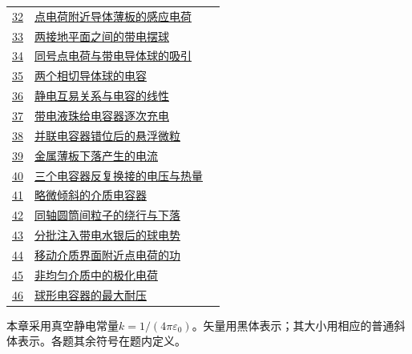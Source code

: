\documentclass[UTF8,fontset=fandol,a4paper,11pt]{ctexart}
\begin{document}
\begin{longtable}{@{}r p{113mm} r@{}}
\hyperref[q:32]{32} & \hyperref[q:32]{点电荷附近导体薄板的感应电荷} & \pageref{q:32} \\

\hyperref[q:33]{33} & \hyperref[q:33]{两接地平面之间的带电摆球} & \pageref{q:33} \\

\hyperref[q:34]{34} & \hyperref[q:34]{同号点电荷与带电导体球的吸引} & \pageref{q:34} \\

\hyperref[q:35]{35} & \hyperref[q:35]{两个相切导体球的电容} & \pageref{q:35} \\

\hyperref[q:36]{36} & \hyperref[q:36]{静电互易关系与电容的线性} & \pageref{q:36} \\

\hyperref[q:37]{37} & \hyperref[q:37]{带电液珠给电容器逐次充电} & \pageref{q:37} \\

\hyperref[q:38]{38} & \hyperref[q:38]{并联电容器错位后的悬浮微粒} & \pageref{q:38} \\

\hyperref[q:39]{39} & \hyperref[q:39]{金属薄板下落产生的电流} & \pageref{q:39} \\

\hyperref[q:40]{40} & \hyperref[q:40]{三个电容器反复换接的电压与热量} & \pageref{q:40} \\

\hyperref[q:41]{41} & \hyperref[q:41]{略微倾斜的介质电容器} & \pageref{q:41} \\

\hyperref[q:42]{42} & \hyperref[q:42]{同轴圆筒间粒子的绕行与下落} & \pageref{q:42} \\

\hyperref[q:43]{43} & \hyperref[q:43]{分批注入带电水银后的球电势} & \pageref{q:43} \\

\hyperref[q:44]{44} & \hyperref[q:44]{移动介质界面附近点电荷的功} & \pageref{q:44} \\

\hyperref[q:45]{45} & \hyperref[q:45]{非均匀介质中的极化电荷} & \pageref{q:45} \\

\hyperref[q:46]{46} & \hyperref[q:46]{球形电容器的最大耐压} & \pageref{q:46} \\

\bottomrule\end{longtable}

\vspace{6mm}\noindent 本章采用真空静电常量$k=1/(4\pi\varepsilon_0)$。矢量用黑体表示；其大小用相应的普通斜体表示。各题其余符号在题内定义。
\end{document}
